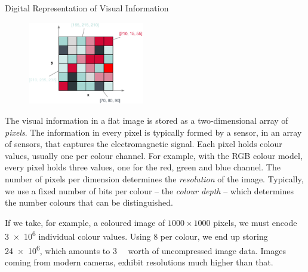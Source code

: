 \begin{example}[label=example:representation_visual_information]{Digital Representation of Visual Information}{}
    \begin{figure}
        \includegraphics[width=0.45\textwidth]{figures/example-visual-signal.eps}
    \end{figure}
    The visual information in a flat image is stored as a two-dimensional array of \emph{pixels}. The information in every pixel is typically formed by a sensor, in an array of sensors, that captures the electromagnetic signal. Each pixel holds colour values, usually one per colour channel. For example, with the RGB colour model, every pixel holds three values, one for the red, green and blue channel. The number of pixels per dimension determines the \emph{resolution} of the image. Typically, we use a fixed number of bits per colour -- the \emph{colour depth} -- which determines the number colours that can be distinguished.

    If we take, for example, a coloured image of $1000 \times 1000$ pixels, we must encode \num{3e6} individual colour values. Using \SI{8}{\bit} per colour, we end up storing \SI{24e6}{\bit}, which amounts to \SI{3}{\mega\byte} worth of uncompressed image data. Images coming from modern cameras, exhibit resolutions much higher than that.
\end{example}

